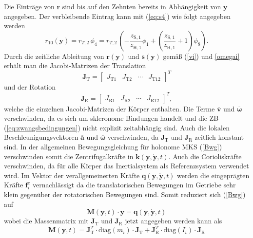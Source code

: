 Die Einträge von $\pmb{r}$ sind bis auf den Zehnten bereits in Abhängigkeit von $\pmb{y}$ angegeben. Der verbleibende Eintrag kann mit (\ref{eq:s4}) wie folgt angegeben werden
\begin{equation}
r_{10}(\pmb{y}) = r_{T,2}\,\phi_4 = r_{T,2}\,\left(-\frac{z_{\mathrm{S,1}} }{z_{\mathrm{H,1}} } \phi_1 +\left(\frac{z_{\mathrm{S,1}} }{z_{\mathrm{H,1}} }+1\right) \phi_8\right).
\end{equation}
Durch die zeitliche Ableitung von $\pmb{r}(\pmb{y})$ und $\pmb{s}(\pmb{y})$ gemäß (\ref{vi}) und \ref{omegai} erhält man die Jacobi-Matrizen der Translation
\begin{equation}
\pmb{J}_\mathrm{T} = \begin{bmatrix}
J_\mathrm{T1} & J_\mathrm{T2} & \cdots & J_\mathrm{T12}
\end{bmatrix}^T
\end{equation}  
und der Rotation 
\begin{equation}
\pmb{J}_\mathrm{R} = \begin{bmatrix}
J_\mathrm{R1} & J_\mathrm{R2} & \cdots & J_\mathrm{R12}
\end{bmatrix}^T,
\end{equation} 
welche die einzelnen Jacobi-Matrizen der Körper enthalten. Die Terme $\overline{\pmb{v}}$ und $\overline{\pmb{\omega}}$ verschwinden, da es sich um skleronome Bindungen handelt und die ZB (\ref{eq:zwangsbedingungen}) nicht explizit zeitabhängig sind. Auch die lokalen Beschleunigungsvektoren $\overline{\pmb{a}}$ und $\overline{\pmb{\omega}}$ verschwinden, da $\pmb{J}_\mathrm{T}$ und $\pmb{J}_\mathrm{R}$ zeitlich konstant sind. In der allgemeinen Bewegungsgleichung für holonome MKS (\ref{Bwg}) verschwinden somit die Zentrifugalkräfte in $\pmb{k}(\pmb{y},\dot{\pmb{y}},t)$. Auch die Corioliskräfte verschwinden, da für alle Körper das Inertialsystem als Referenzsystem verwendet wird. Im Vektor der verallgemeinerten Kräfte $\pmb{q}(\pmb{y},\dot{\pmb{y}},t)$ werden die eingeprägten Kräfte $\pmb{f}^e_i$ vernachlässigt da die translatorischen Bewegungen im Getriebe sehr klein gegenüber der rotatorischen Bewegungen sind. Somit reduziert sich (\ref{Bwg}) auf
\begin{equation}
\pmb{M}(\pmb{y},t)\cdot\ddot{\pmb{y}} = \pmb{q}(\pmb{y},\dot{\pmb{y}},t)
\end{equation}
wobei die Massenmatrix mit $\pmb{J}_\mathrm{T}$ und $\pmb{J}_\mathrm{R}$ jetzt angegeben werden kann als 
  \begin{equation}
\pmb{M}(\pmb{y},t) = \pmb{J}_\mathrm{T}^T\cdot\mathrm{diag}(m_i)\cdot\pmb{J}_\mathrm{T}+\pmb{J}_\mathrm{R}^T\cdot\mathrm{diag}(I_i)\cdot\pmb{J}_\mathrm{R}
\end{equation}
